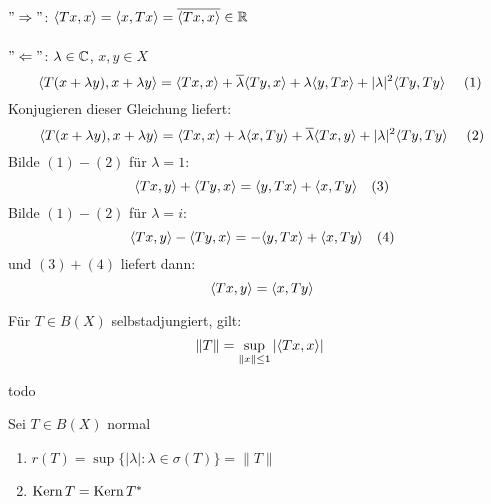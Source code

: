 \begin{beweis}
	$" \Rightarrow "$: $\langle T x , x \rangle = \langle x , T x \rangle = \overline{\langle T x , x \rangle} \in \mathbb{R}$ \\ \\
	$" \Leftarrow "$: $\lambda \in \mathbb{C}$, $x, y \in X$ \\
	\[ \< T ( x + \lambda y ) , x + \lambda y \> =  \< T x , x \> + \overline{\lambda} \< T y , x \> + \lambda \< y, T x \> + | \lambda |^{2} \< T y , T y \> \quad (1) \label{eq:19.7.5-1} \]
	Konjugieren dieser Gleichung liefert:
	\[ \< T ( x + \lambda y ) , x + \lambda y \> =  \< T x , x \> + \lambda \< x , T y \> + \overline{\lambda} \< T x , y \> + | \lambda |^{2} \< T y , T y \> \quad (2) \label{eq:19.7.5-2} \]
	Bilde $\hyperref[eq:19.7.5-1]{(1)} - \hyperref[eq:19.7.5-2]{(2)}$ für $\lambda = 1$:
	\[  \< T x , y \> + \< T y , x \> = \< y , T x \> + \< x , T y \> \quad (3) \label{eq:19.7.5-3} \]
	Bilde $\hyperref[eq:19.7.5-1]{(1)} - \hyperref[eq:19.7.5-2]{(2)}$ für $\lambda = i$:
	\[ \< T x , y \> - \< T y , x \> = - \< y , T x \> + \< x , T y \> \quad (4) \label{eq:19.7.5-4} \]
	und $\hyperref[eq:19.7.5-3]{(3)} + \hyperref[eq:19.7.5-4]{(4)}$ liefert dann:
	\[ \< T x , y \> = \< x , T y \> \]
\end{beweis}


\begin{prop}
	Für $T \in B(X)$ selbstadjungiert, gilt:
	\[ \| T \| = \sup_{\| x \| \leq 1} |\langle T x , x \rangle| \]	
\end{prop}

\begin{beweis}
	todo %
\end{beweis}


\begin{prop} \label{prop:19.9}
	Sei $T \in B(X)$ normal
	\begin{enumerate}[label=\alph*\upshape)]
		\item $r(T) = \sup \{ | \lambda | : \lambda \in \sigma(T) \} = \| T \|$
		\item $\mathop{\rm Kern}\nolimits T = \mathop{\rm Kern}\nolimits T^{*}$
	\end{enumerate}	
\end{prop}

